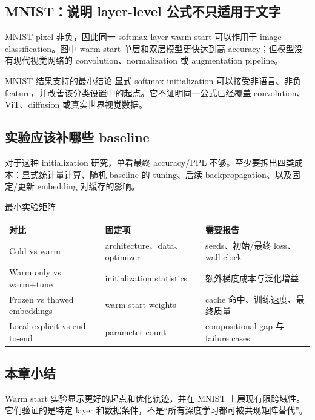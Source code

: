 

\subsection{MNIST：说明 layer-level 公式不只适用于文字}

MNIST pixel 非负，因此同一 softmax layer warm start 可以作用于 image classification。图中 warm-start 单层和双层模型更快达到高 accuracy；但模型没有现代视觉网络的 convolution、normalization 或 augmentation pipeline。


\begin{importantbox}{MNIST 结果支持的最小结论}
显式 softmax initialization 可以接受非语言、非负 feature，并改善该分类设置中的起点。它不证明同一公式已经覆盖 convolution、ViT、diffusion 或真实世界视觉数据。
\end{importantbox}



\subsection{实验应该补哪些 baseline}

对于这种 initialization 研究，单看最终 accuracy/PPL 不够。至少要拆出四类成本：显式统计量计算、随机 baseline 的 tuning、后续 backpropagation、以及固定/更新 embedding 对缓存的影响。

\begin{knowledgebox}{最小实验矩阵}
\begin{tabularx}{\textwidth}{L{0.18\textwidth} L{0.24\textwidth} X}
\toprule
对比 & 固定项 & 需要报告 \\
\midrule
Cold vs warm & architecture、data、optimizer & seeds、初始/最终 loss、wall-clock \\
Warm only vs warm+tune & initialization statistics & 额外梯度成本与泛化增益 \\
Frozen vs thawed embeddings & warm-start weights & cache 命中、训练速度、最终质量 \\
Local explicit vs end-to-end & parameter count & compositional gap 与 failure cases \\
\bottomrule
\end{tabularx}
\end{knowledgebox}

\subsection{本章小结}

Warm start 实验显示更好的起点和优化轨迹，并在 MNIST 上展现有限跨域性。它们验证的是特定 layer 和数据条件，不是“所有深度学习都可被共现矩阵替代”。

